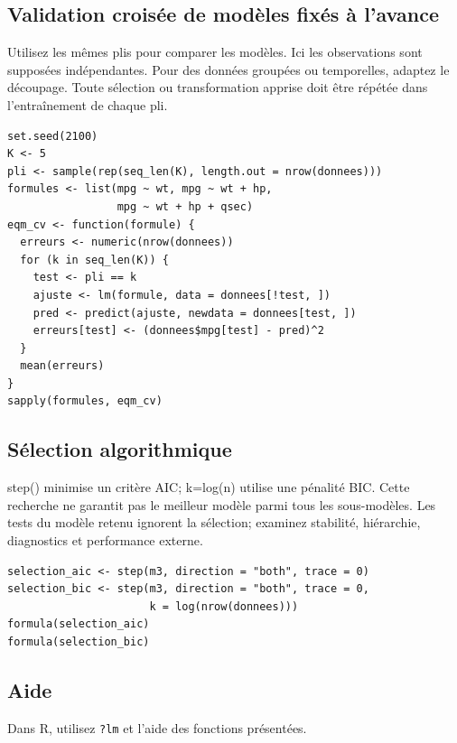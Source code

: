 \documentclass[letterpaper,11pt]{article}
\begin{document}
\par\medskip\noindent\begin{minipage}{\linewidth}
\subsection*{Validation croisée de modèles fixés à l’avance}
Utilisez les mêmes plis pour comparer les modèles. Ici les observations sont supposées indépendantes. Pour des données groupées ou temporelles, adaptez le découpage. Toute sélection ou transformation apprise doit être répétée dans l'entraînement de chaque pli.
\begin{Verbatim}
set.seed(2100)
K <- 5
pli <- sample(rep(seq_len(K), length.out = nrow(donnees)))
formules <- list(mpg ~ wt, mpg ~ wt + hp,
                 mpg ~ wt + hp + qsec)
eqm_cv <- function(formule) {
  erreurs <- numeric(nrow(donnees))
  for (k in seq_len(K)) {
    test <- pli == k
    ajuste <- lm(formule, data = donnees[!test, ])
    pred <- predict(ajuste, newdata = donnees[test, ])
    erreurs[test] <- (donnees$mpg[test] - pred)^2
  }
  mean(erreurs)
}
sapply(formules, eqm_cv)
\end{Verbatim}

\end{minipage}\par
\par\medskip\noindent\begin{minipage}{\linewidth}
\subsection*{Sélection algorithmique}
step() minimise un critère AIC; k=log(n) utilise une pénalité BIC. Cette recherche ne garantit pas le meilleur modèle parmi tous les sous-modèles. Les tests du modèle retenu ignorent la sélection; examinez stabilité, hiérarchie, diagnostics et performance externe.
\begin{Verbatim}
selection_aic <- step(m3, direction = "both", trace = 0)
selection_bic <- step(m3, direction = "both", trace = 0,
                      k = log(nrow(donnees)))
formula(selection_aic)
formula(selection_bic)
\end{Verbatim}

\end{minipage}\par
\par\medskip\noindent\begin{minipage}{\linewidth}
\subsection*{Aide}
Dans R, utilisez \texttt{?lm} et l’aide des fonctions présentées. 
\end{minipage}\par
\end{document}
